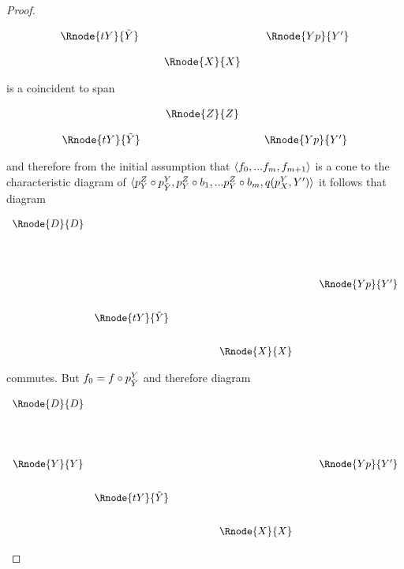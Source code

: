 \documentclass[10pt,a4paper]{scrartcl}
\begin{document}
\begin{proof}
\begin{enumerate}[(i)]
\begin{center}
\begin{equation}
\begin{array}{cp{0.1cm}cp{0.1cm} c}
\Rnode{tY}{\pbase{Y}}& &                & & \Rnode{Yp}{Y'} \\ [0.4cm]
            & &\Rnode{X}{X}
\end{array}
\end{equation}
\end{center}
is a coincident  to span 
\begin{center}
\begin{equation}
\begin{array}{cp{0.1cm}cp{0.1cm} c}
            & &\Rnode{Z}{Z}                  \\ [0.4cm]
\Rnode{tY}{\pbase{Y}}& &                & & \Rnode{Yp}{Y'} 
\end{array}
\end{equation}
\end{center}

and therefore from the initial assumption that $\langle f_0,...f_m, f_{m+1}\rangle$ is a cone to the characteristic diagram of
$\langle p^{Z}_{Y} \circ p^{Y}_{\tilde{Y}}, p^{Z}_{Y} \circ b_1, ... p^{Z}_{Y} \circ b_m,q(p^{Y}_{X},Y')\rangle$ it follows that diagram 
\begin{center}
\begin{displaymath}
\begin{array}{c c p{1.0cm} c p{0.2cm}c}
  \Rnode{D}{D} & &                       & &  &                  \\ [1.6cm]
               & &                       & &  & \Rnode{Yp}{Y'}   \\ [0.7cm]
	             &  \Rnode{tY}{\pbase{Y}} & &  &                  \\ [0.7cm]
	             & &                       & \Rnode{X}{X} & & 
\end{array} 
\end{displaymath}
\end{center}
commutes. But $f_0 = f \circ p^{Y}_{\tilde{Y}}$ and therefore diagram

\begin{center}
\begin{displaymath}
\begin{array}{c c p{1.0cm} c p{0.2cm}c}
  \Rnode{D}{D} & &                       & &  &                  \\ [1.6cm]
  \Rnode{Y}{Y} & &                       & &  & \Rnode{Yp}{Y'}   \\ [0.7cm]
	             &  \Rnode{tY}{\pbase{Y}} & &  &                  \\ [0.7cm]
	             & &                       & \Rnode{X}{X} & & 
\end{array} 
\end{displaymath}
\end{center}


\end{enumerate}
\end{proof}
\end{document}
